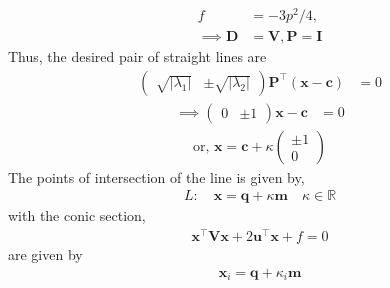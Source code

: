 \documentclass[10pt,a4paper]{report}
\newcommand{\myvec}[1]{\ensuremath{\begin{pmatrix}#1\end{pmatrix}}}
\let\vec\mathbf
\providecommand{\abs}[1]{\left\vert#1\right\vert}
\let\vec\mathbf
\providecommand{\brak}[1]{\ensuremath{\left(#1\right)}}
\begin{document}
\begin{multicols}{2}
\begin{align}
{    }
\\
	f&=-3p^2/4,
	\\
 \implies \vec{D} &= \vec{V}, \vec{P} = \vec{I}
 \end{align} 
 Thus, the desired pair of straight lines are \\
 \begin{align}
       \myvec{\sqrt{\abs{\lambda_1}} & \pm \sqrt{\abs{\lambda_2}}}\vec{P}^{\top}\brak{\vec
    {x}-\vec{c}} &= 0
 \end{align}
\begin{align}
    \implies\myvec{0 & \pm 1}\vec{x}-\vec{c} &= 0
\end{align}
 \begin{align}
      \text{or, }\vec{x} =\vec{c} + \kappa \myvec{\pm 1 \\ 0}
\end{align}
The points of intersection of the line is given by, \\
 \begin{align} L: \quad \vec{x} = \vec{q} + \kappa \vec{m} \quad \kappa \in \mathbb{R}
\end{align}
 with the conic section, \\
 \begin{align}
         \vec{x}^{\top}\vec{V}\vec{x} + 2\vec{u}^{\top} \vec{x} + f = 0
 \end{align}
are given by \\
 \begin{align}
 \vec{x}_i = \vec{q} + \kappa_i \vec{m}
 \end{align}

\end{multicols}
\end{document}
